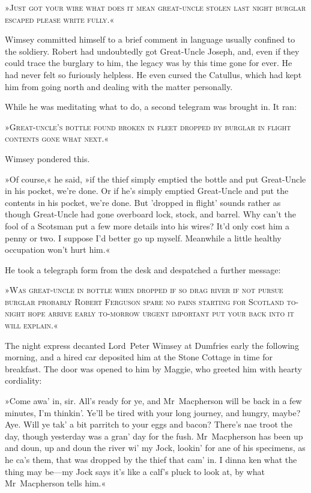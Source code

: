 »\textsc{Just got your wire what does it mean great-uncle stolen last night burglar escaped please write fully.}«

Wimsey committed himself to a brief comment in language usually confined to the soldiery. Robert had undoubtedly got Great-Uncle Joseph, and, even if they could trace the burglary to him, the legacy was by this time gone for ever. He had never felt so furiously helpless. He even cursed the Catullus, which had kept him from going north and dealing with the matter personally.

While he was meditating what to do, a second telegram was brought in. It ran:

»\textsc{Great-uncle's bottle found broken in fleet dropped by burglar in flight contents gone what next.}«

Wimsey pondered this.

»Of course,« he said, »if the thief simply emptied the bottle and put Great-Uncle in his pocket, we're done. Or if he's simply emptied Great-Uncle and put the contents in his pocket, we're done. But 'dropped in flight' sounds rather as though Great-Uncle had gone overboard lock, stock, and barrel. Why can't the fool of a Scotsman put a few more details into his wires? It'd only cost him a penny or two. I suppose I'd better go up myself. Meanwhile a little healthy occupation won't hurt him.«

He took a telegraph form from the desk and despatched a further message:

»\textsc{Was great-uncle in bottle when dropped if so drag river if not pursue burglar probably Robert Ferguson spare no pains starting for Scotland to-night hope arrive early to-morrow urgent important put your back into it will explain.}«

The night express decanted Lord~Peter Wimsey at Dumfries early the following morning, and a hired car deposited him at the Stone Cottage in time for breakfast. The door was opened to him by Maggie, who greeted him with hearty cordiality:

»Come awa' in, sir. All's ready for ye, and Mr~Macpherson will be back in a few minutes, I'm thinkin'. Ye'll be tired with your long journey, and hungry, maybe? Aye. Will ye tak' a bit parritch to your eggs and bacon? There's nae troot the day, though yesterday was a gran' day for the fush. Mr~Macpherson has been up and doun, up and doun the river wi' my Jock, lookin' for ane of his specimens, as he ca's them, that was dropped by the thief that cam' in. I dinna ken what the thing may be—my Jock says it's like a calf's pluck to look at, by what Mr~Macpherson tells him.«

